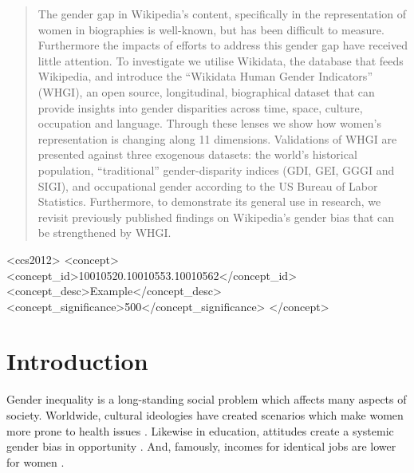 \documentclass{sig-alternate-05-2015}
\begin{document}
\maketitle
\begin{abstract}
The gender gap in Wikipedia's content, specifically in the representation of women in biographies is well-known, but has been difficult to measure. Furthermore the impacts of efforts to address this gender gap have received little attention. To investigate we utilise Wikidata, the database that feeds Wikipedia, and introduce the ``Wikidata Human Gender Indicators'' (WHGI), an open source, longitudinal, biographical dataset that can provide insights into gender disparities across time, space, culture, occupation and language. Through these lenses we show how women's representation is changing along 11 dimensions. Validations of WHGI are presented against three exogenous datasets: the world's historical population, ``traditional'' gender-disparity indices (GDI, GEI, GGGI and SIGI), and occupational gender according to the US Bureau of Labor Statistics. Furthermore, to demonstrate its general use in research, we revisit previously published findings on Wikipedia's gender bias that can be strengthened by WHGI. 
\end{abstract}


%
%
\begin{CCSXML}
<ccs2012>
 <concept>
  <concept_id>10010520.10010553.10010562</concept_id>
  <concept_desc>Example</concept_desc>
  <concept_significance>500</concept_significance>
 </concept>

\end{CCSXML}



%
%

%
%
\printccsdesc



\section{Introduction}

Gender inequality is a long-standing social problem which affects many aspects of society. Worldwide, cultural ideologies have created scenarios which make women more prone to health issues \cite{world_health_organization_women_2009}. Likewise in education, attitudes create a systemic gender bias in opportunity \cite{heward_gender_1999}. And, famously, incomes for identical jobs are lower for women \cite{burstein_equal_????}.
\end{document}
